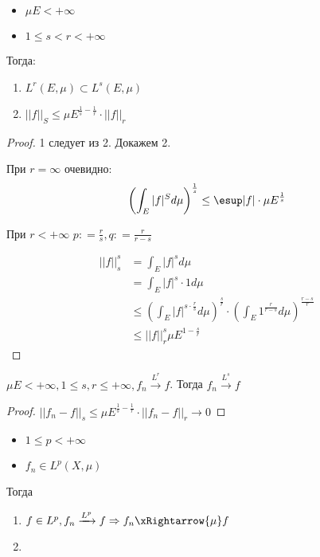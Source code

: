 \begin{theorem}\itemfix
    \begin{itemize}
        \item \(\mu E < +\infty\)
        \item \(1 \leq s < r < +\infty\)
    \end{itemize}

    Тогда:
    \begin{enumerate}
        \item \(L^r(E, \mu) \subset L^s(E, \mu)\)
        \item \(||f||_S \leq \mu E^{\frac{1}{s} - \frac{1}{r}} \cdot ||f||_r\)
    \end{enumerate}
\end{theorem}
\begin{proof}
    1 следует из 2. Докажем 2.

    При \(r = \infty\) очевидно:
    \[\left(\int_E |f|^S d\mu \right)^{\frac{1}{s}} \leq \esup |f| \cdot \mu E^{\frac{1}{s}}\]

    При \(r < +\infty\) \(p : = \frac{r}{s}, q : = \frac{r}{r - s}\)

    \begin{align*}
        ||f||_s^s & = \int_E |f|^s d\mu                                                                                                                             \\
                  & = \int_E |f|^s \cdot 1 d\mu                                                                                                                     \\
                  & \leq \left( \int_E |f|^{s \cdot \frac{r}{s}} d\mu \right)^{\frac{s}{r}} \cdot \left( \int_E 1^{\frac{r}{r - s}} d\mu \right)^{\frac{r - s}{r} } \\
                  & \leq ||f||_r^s \mu E^{1 - \frac{s}{r}}
    \end{align*}
\end{proof}
\begin{corollary}
    \(\mu E < +\infty, 1 \leq s, r \leq +\infty, f_n \xrightarrow{L^r} f\). Тогда \(f_n \xrightarrow{L^s} f\)
\end{corollary}
\begin{proof}
    \(||f_n - f||_s \leq \mu E^{\frac{1}{s} - \frac{1}{r}} \cdot ||f_n - f||_r \to 0\)
\end{proof}

\begin{theorem}\itemfix
    \begin{itemize}
        \item \(1 \leq p < +\infty\)
        \item \(f_n \in L^p(X, \mu)\)
    \end{itemize}
    Тогда
    \begin{enumerate}
        \item \(f \in L^p, f_n \xrightarrow{L^p} f \Rightarrow f_n \xRightarrow{\mu} f\)
        \item \unfinished %
    \end{enumerate}
\end{theorem}

